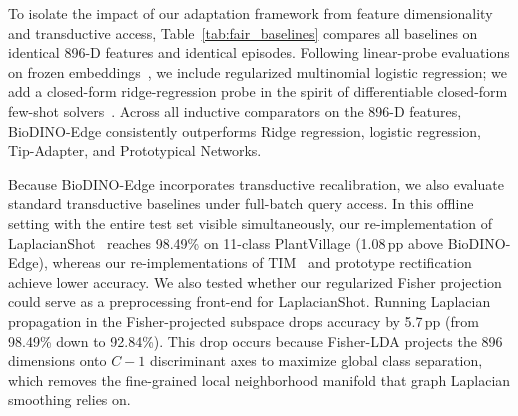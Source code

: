 \documentclass[preprint,12pt]{elsarticle}
\begin{document}
To isolate the impact of our adaptation framework from feature dimensionality and transductive access, Table~\ref{tab:fair_baselines} compares all baselines on identical 896-D features and identical episodes. Following linear-probe evaluations on frozen embeddings~\cite{tian2020rethinking}, we include regularized multinomial logistic regression; we add a closed-form ridge-regression probe in the spirit of differentiable closed-form few-shot solvers~\cite{bertinetto2019r2d2}. Across all inductive comparators on the 896-D features, BioDINO-Edge consistently outperforms Ridge regression, logistic regression, Tip-Adapter, and Prototypical Networks.

Because BioDINO-Edge incorporates transductive recalibration, we also evaluate standard transductive baselines under full-batch query access. In this offline setting with the entire test set visible simultaneously, our re-implementation of LaplacianShot~\cite{ziko2020laplacian} reaches 98.49\% on 11-class PlantVillage (1.08\,pp above BioDINO-Edge), whereas our re-implementations of TIM~\cite{boudiaf2020transductive} and prototype rectification~\cite{liu2020bdcspn} achieve lower accuracy. We also tested whether our regularized Fisher projection could serve as a preprocessing front-end for LaplacianShot. Running Laplacian propagation in the Fisher-projected subspace drops accuracy by 5.7\,pp (from 98.49\% down to 92.84\%). This drop occurs because Fisher-LDA projects the 896 dimensions onto $C-1$ discriminant axes to maximize global class separation, which removes the fine-grained local neighborhood manifold that graph Laplacian smoothing relies on.
\end{document}
